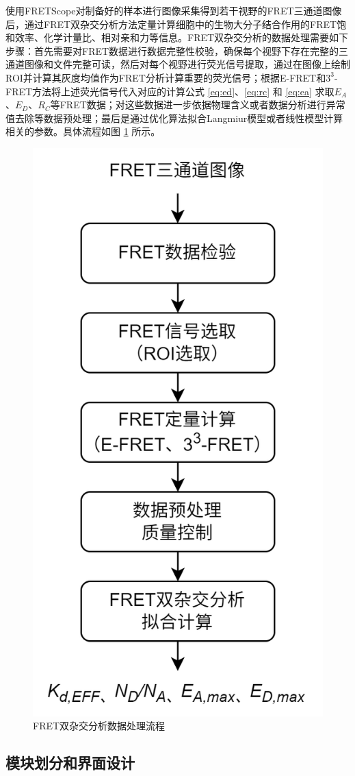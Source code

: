 使用FRETScope对制备好的样本进行图像采集得到若干视野的FRET三通道图像后，通过FRET双杂交分析方法定量计算细胞中的生物大分子结合作用的FRET饱和效率、化学计量比、相对亲和力等信息。FRET双杂交分析的数据处理需要如下步骤：首先需要对FRET数据进行数据完整性校验，确保每个视野下存在完整的三通道图像和文件完整可读，然后对每个视野进行荧光信号提取，通过在图像上绘制ROI并计算其灰度均值作为FRET分析计算重要的荧光信号；根据E-FRET和$3^3$-FRET方法将上述荧光信号代入对应的计算公式 \ref{eq:ed}、\ref{eq:rc} 和 \ref{eq:ea} 求取$E_A$、$E_D$、$R_C$等FRET数据；对这些数据进一步依据物理含义或者数据分析进行异常值去除等数据预处理；最后是通过优化算法拟合Langmiur模型或者线性模型计算相关的参数。具体流程如图 \ref{fig:tha_data_process} 所示。

\begin{figure}[hbtp]
    \centering
    \includegraphics[width=0.4\linewidth]{../figures/2/2_FRET双杂交分析数据处理流程.png}
    \caption{FRET双杂交分析数据处理流程}
    \label{fig:tha_data_process}
\end{figure}

\fi

\subsection{模块划分和界面设计}

